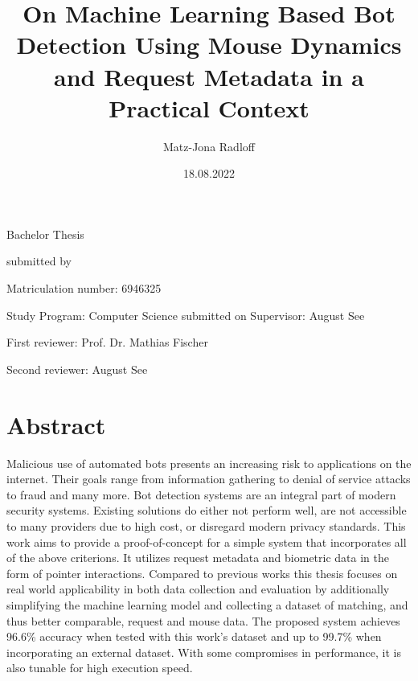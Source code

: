 \documentclass[
    fontsize=12pt,
    headings=small,
    parskip=half,           %
    bibliography=totoc,
    numbers=noenddot,       %
    open=any,               %
    final,                   %
    table
]{scrreprt}
\begin{document}
\title{On Machine Learning Based Bot Detection Using Mouse Dynamics and Request Metadata in a Practical Context}
\author{Matz-Jona Radloff}
\date{18.08.2022} %


\begin{titlepage}
\begin{center}\Large
    \vfill
    Bachelor Thesis
    \vfill
    \makeatletter
    {\Large\textsf{\textbf{\@title}}\par}
    \makeatother
    \vfill
    submitted by
    \par\bigskip
    \makeatletter
    {\@author} \par
    \makeatother
    Matriculation number: 6946325 \par
    Study Program: Computer Science
    \vfill
    \makeatletter
    submitted on {\@date}
    \makeatother
    \vfill
    Supervisor: August See\par
    First reviewer: Prof. Dr. Mathias Fischer \par
    Second reviewer: August See
\end{center}
\end{titlepage}


\chapter*{Abstract}

Malicious use of automated bots presents an increasing risk to applications on the internet. Their goals range from information gathering to denial of service attacks to fraud and many more. Bot detection systems are an integral part of modern security systems. Existing solutions do either not perform well, are not accessible to many providers due to high cost, or disregard modern privacy  standards. This work aims to provide a proof-of-concept for a simple system that incorporates all of the above criterions. It utilizes request metadata and biometric data in the form of pointer interactions. Compared to previous works this thesis focuses on real world applicability in both data collection and evaluation by additionally simplifying the machine learning model and collecting a dataset of matching, and thus better comparable, request and mouse data. The proposed system achieves 96.6\% accuracy when tested with this work's dataset and up to 99.7\% when incorporating an external dataset. With some compromises in performance, it is also tunable for high execution speed.
\end{document}
